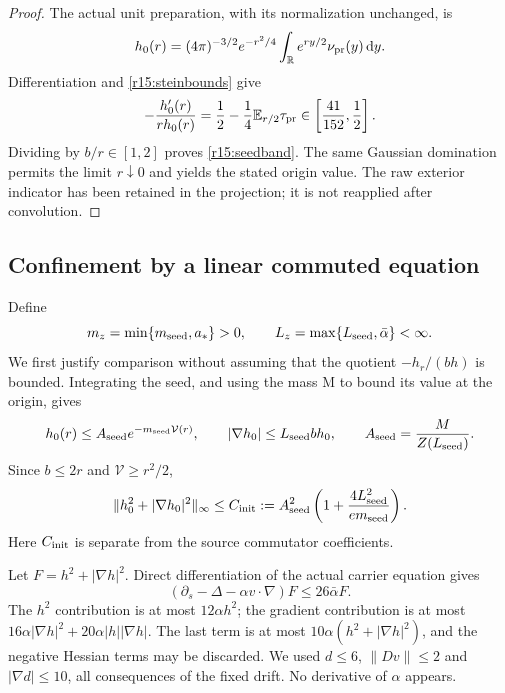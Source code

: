 \documentclass[11pt]{article}
\numberwithin{equation}{section}
\newcommand{\dd}{\,\mathrm d}
\newcommand{\R}{\mathbb R}
\begin{document}
\begin{proof}
The actual unit preparation, with its normalization unchanged, is
\[
 h_0(r)=(4\pi)^{-3/2}e^{-r^2/4}
                 \int_{\R}e^{ry/2}\nu_{\rm pr}(y)\dd y.
\]
Differentiation and \eqref{r15:steinbounds} give
\[
 -\frac{h_0'(r)}{rh_0(r)}
 =\frac12-\frac14\mathbb E_{r/2}\tau_{\rm pr}
 \in\left[\frac{41}{152},\frac12\right].
\]
Dividing by $b/r\in[1,2]$ proves \eqref{r15:seedband}. The same Gaussian
domination permits the limit $r\downarrow0$ and yields the stated
origin value. The raw exterior indicator has been retained in the
projection; it is not reapplied after convolution.
\end{proof}

\subsection{Confinement by a linear commuted equation}

Define
\begin{equation}\label{r15:bandconstants}
 m_z=\min\{m_{\rm seed},a_*\}>0,\qquad
 L_z=\max\{L_{\rm seed},\bar\alpha\}<\infty.
\end{equation}
We first justify comparison without assuming that the quotient
$-h_r/(bh)$ is bounded. Integrating the seed, and using the mass M to
bound its value at the origin, gives
\[
 h_0(r)\le A_{\rm seed}e^{-m_{\rm seed}\mathcal V(r)},\qquad
 |\nabla h_0|\le L_{\rm seed}b h_0,\qquad
 A_{\rm seed}=\frac{M}{Z(L_{\rm seed})}.
\]
Since $b\le2r$ and $\mathcal V\ge r^2/2$,
\begin{equation}\label{r15:initialsup}
 \|h_0^2+|\nabla h_0|^2\|_\infty\le C_{\rm init}:=
 A_{\rm seed}^2\left(1+\frac{4L_{\rm seed}^2}{e m_{\rm seed}}\right).
\end{equation}
Here $C_{\rm init}$ is separate from the source commutator coefficients.

Let $F=h^2+|\nabla h|^2$. Direct differentiation of the actual carrier
equation gives
\[
 (\partial_s-\Delta-\alpha v\cdot\nabla)F
 \le26\bar\alpha F.
\]
The $h^2$ contribution is at most $12\alpha h^2$; the gradient
contribution is at most
$16\alpha|\nabla h|^2+20\alpha|h||\nabla h|$.
The last term is at most $10\alpha(h^2+|\nabla h|^2)$, and the negative
Hessian terms may be discarded. We used $d\le6$, $\|Dv\|\le2$ and
$|\nabla d|\le10$, all consequences of the fixed drift. No derivative
of $\alpha$ appears.
\end{document}
